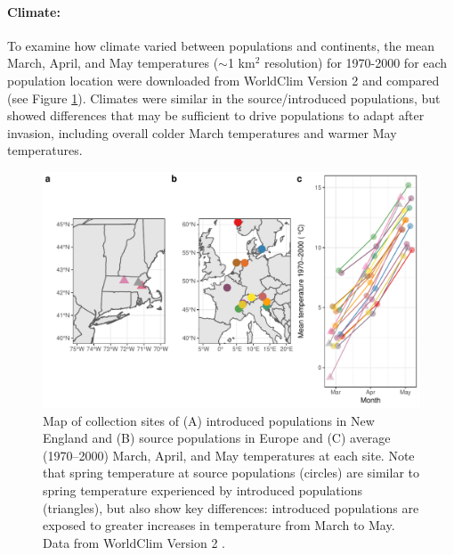 \documentclass[11pt]{article}\usepackage[]{graphicx}\usepackage[]{color}
\begin{document}
	\paragraph{Climate:} 
	To examine how climate varied between populations and continents, the mean March, April, and May temperatures ($\sim$1 km$^2$ resolution) for 1970-2000 for each population location were downloaded from WorldClim Version 2 \parencite{Fick2017}  and compared (see Figure \ref{fig:sites}). Climates were similar in the source/introduced populations, but showed differences that may be sufficient to drive populations to adapt after invasion, including overall colder March temperatures and warmer May temperatures. 
	
	
	\begin{figure} 
		\centering
		\includegraphics[width=1 \textwidth,trim=0cm 0cm 0cm 0cm, angle=0, scale=.9, origin=c,clip=false]{sampling_sites}
		\caption{Map of collection sites of (A) introduced populations in New England and (B) source populations in Europe and (C) average  (1970--2000) March, April, and May temperatures at each site. Note that spring temperature at source populations (circles) are similar to spring temperature experienced by introduced populations (triangles), but also show key differences: introduced populations are exposed to greater increases in temperature from March to May. Data from WorldClim Version 2 \parencite{Fick2017}. } %
		\label{fig:sites}
	\end{figure}
\end{document}
